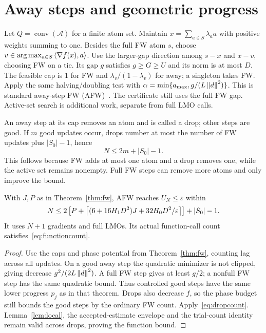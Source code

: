 \section{Away steps and geometric progress}
Let $Q=\operatorname{conv}(\mathcal A)$ for a finite atom set.
Maintain $x=\sum_{a\in S}\lambda_a a$ with positive weights summing
to one. Besides the full FW atom $s$, choose
$v\in\arg\max_{a\in S}\left\langle\nabla f(x),a\right\rangle$.
Use the larger-gap direction among $s-x$ and $x-v$, choosing FW on a
tie. Its gap $g$ satisfies $g\ge G\ge U$ and its norm is at most $D$.
The feasible cap is $1$ for FW and $\lambda_v/(1-\lambda_v)$ for
away; a singleton takes FW. Apply the same halving/doubling test with
$\alpha=\min\{a_{\max},g/(L\left\|d\right\|^2)\}$.
This is standard away-step FW (AFW)~\cite{lacostejaggi,pedregosa}.
The certificate still uses the full FW gap. Active-set search is
additional work, separate from full LMO calls.

An away step at its cap removes an atom and is called a drop;
other steps are good. If $m$ good updates occur, drops number at most
the number of FW updates plus $|S_0|-1$, hence
\begin{equation}\label{eq:dropcount}
 N\le2m+|S_0|-1.
\end{equation}
This follows because FW adds at most one atom and a drop removes one,
while the active set remains nonempty. Full FW steps can remove more
atoms and only improve the bound.

\begin{theorem}\label{thm:afw}
With $J,P$ as in Theorem~\ref{thm:fw}, AFW reaches
$U_N\le\varepsilon$ within
\[
 N\le2\left[P+\left\lceil(6+16H_1D^2)J+32H_0D^2/\varepsilon\right\rceil\right]
       +|S_0|-1.
\]
It uses $N+1$ gradients and full LMOs.
Its actual function-call count satisfies~\eqref{eq:functioncount}.
\end{theorem}
\begin{proof}
Use the caps and phase potential from Theorem~\ref{thm:fw}, counting
lag across all updates. On a good away step the quadratic minimizer
is not clipped, giving decrease $g^2/(2L\left\|d\right\|^2)$.
A full FW step gives at least $g/2$; a nonfull FW step has the same
quadratic bound. Thus controlled good steps have the same lower
progress $p_j$ as in that theorem. Drops also decrease $f$, so the
phase budget still bounds the good steps by the ordinary FW count.
Apply~\eqref{eq:dropcount}. Lemma~\ref{lem:local}, the accepted-estimate
envelope and the trial-count identity remain valid across drops,
proving the function bound.
\end{proof}

